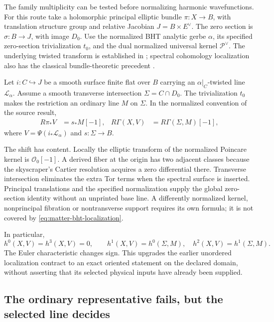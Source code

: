 \documentclass[11pt,a4paper]{article}
\begin{document}
The family multiplicity can be tested before normalizing harmonic
wavefunctions. For this route take a holomorphic principal elliptic
bundle \(\pi:X\to B\), with translation structure group and relative
Jacobian \(J=B\times E^\vee\). The zero section is
\(\sigma:B\to J\), with image \(D_0\). Use the normalized BHT analytic
gerbe \(\alpha\), its specified zero-section trivialization \(t_0\),
and the dual normalized universal kernel \(\mathcal P^\vee\).
The underlying twisted transform is established in
\cite{BrinzanescuHalanayTrautmann2010}; spectral cohomology localization
also has the classical bundle-theoretic precedent
\cite{FriedmanMorganWitten1997}.

Let \(i:C\hookrightarrow J\) be a smooth surface finite flat over \(B\)
carrying an \(\alpha|_C\)-twisted line \(\mathcal L_\alpha\).
Assume a smooth transverse intersection
\(\Sigma=C\cap D_0\). The trivialization \(t_0\) makes the restriction
an ordinary line \(M\) on \(\Sigma\). In the normalized convention of
the source result,
\begin{align}
 R\pi_*V&=s_*M[-1],&
 R\Gamma(X,V)&=R\Gamma(\Sigma,M)[-1],
 \label{eq:matter-bht-localization}
\end{align}
where \(V=\Psi(i_*\mathcal L_\alpha)\) and \(s:\Sigma\to B\).

The shift has content. Locally the elliptic transform of the normalized
Poincare kernel is \(\mathcal O_0[-1]\). A derived fiber at the origin
has two adjacent classes because the skyscraper's Cartier resolution
acquires a zero differential there. Transverse intersection eliminates
the extra Tor terms when the spectral surface is inserted. Principal
translations and the specified normalization supply the global
zero-section identity without an unprinted base line. A differently
normalized kernel, nonprincipal fibration or nontransverse support
requires its own formula; it is not covered by
\eqref{eq:matter-bht-localization}.

In particular,
\[
 h^0(X,V)=h^3(X,V)=0,\qquad
 h^1(X,V)=h^0(\Sigma,M),\quad h^2(X,V)=h^1(\Sigma,M).
\]
The Euler characteristic changes sign. This upgrades the earlier
unordered localization contract to an exact oriented statement on
the declared domain, without asserting that its selected physical
inputs have already been supplied.

\subsection{The ordinary representative fails, but the selected line decides}
\label{sec:matter-graph-prym}
\end{document}
